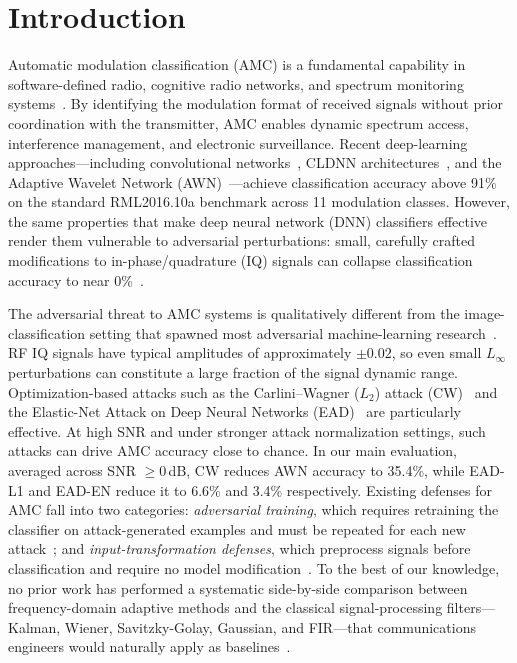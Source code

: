 \chapter{Introduction}
\label{ch:intro}

Automatic modulation classification (AMC) is a fundamental capability in
software-defined radio, cognitive radio networks, and spectrum monitoring
systems~\cite{dobre2007survey,hazza2013overview}. By identifying the
modulation format of received signals without prior coordination with the
transmitter, AMC enables dynamic spectrum access, interference management,
and electronic surveillance. Recent deep-learning approaches---including
convolutional networks~\cite{otoole2016rml}, CLDNN
architectures~\cite{zhang2023cldnn}, and the Adaptive Wavelet Network
(AWN)~\cite{li2023awn}---achieve classification accuracy above 91\% on the
standard RML2016.10a benchmark across 11 modulation classes. However, the same
properties that make deep neural network (DNN) classifiers effective render
them vulnerable to adversarial perturbations: small, carefully crafted
modifications to in-phase/quadrature (IQ) signals can collapse classification
accuracy to near
0\%~\cite{szegedy2014intriguing,silvaco2023adversarial_rf,lin2020tactics}.

The adversarial threat to AMC systems is qualitatively different from the
image-classification setting that spawned most adversarial machine-learning
research~\cite{goodfellow2015fgsm,madry2018pgd}. RF IQ signals have typical
amplitudes of approximately $\pm 0.02$, so even small $L_\infty$ perturbations
can constitute a large fraction of the signal dynamic range. Optimization-based
attacks such as the Carlini--Wagner ($L_2$) attack
(CW)~\cite{carlini2017towards} and the Elastic-Net Attack on Deep Neural
Networks (EAD)~\cite{chen2020ead} are particularly effective. At high SNR and
under stronger attack normalization settings, such attacks can drive AMC
accuracy close to chance. In our main evaluation, averaged across SNR
$\geq 0$\,dB, CW reduces AWN accuracy to 35.4\%, while EAD-L1 and EAD-EN
reduce it to 6.6\% and 3.4\% respectively. Existing defenses for AMC fall
into two categories: \emph{adversarial training}, which requires retraining
the classifier on attack-generated examples and must be repeated for each new
attack~\cite{madry2018towards,tramer2017ensemble}; and
\emph{input-transformation defenses}, which preprocess signals before
classification and require no model modification~\cite{guo2018input,xu2018feature}.
To the best of our knowledge, no prior work has performed a systematic
side-by-side comparison between frequency-domain adaptive methods and the
classical signal-processing filters---Kalman, Wiener, Savitzky-Golay, Gaussian,
and FIR---that communications engineers would naturally apply as
baselines~\cite{haykin2002adaptive,proakis2006digital}.


